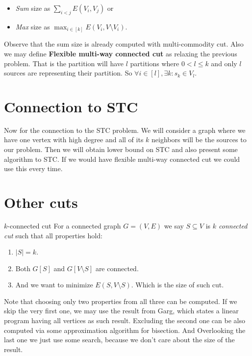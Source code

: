 \documentclass{article}
\begin{document}
	\begin{itemize}
		\item \textit{Sum} size as $\sum_{i < j} E(V_i, V_j)$ or
		\item \textit{Max} size as $\max_{i \in[k]} E(V_i, V \setminus V_i)$.
	\end{itemize}
	
	Observe that the sum size is already computed with multi-commodity cut. Also we may define \textbf{Flexible multi-way connected cut} as relaxing the previous problem. That is the partition will have $l$ partitions where $0 < l \leq k$ and only $l$ sources are representing their partition. So $\forall i \in [l] , \exists k : s_k \in V_l$.
	
	\section{Connection to STC}
	
	Now for the connection to the STC problem. We will consider a graph where we have one vertex with high degree and all of its $k$ neighbors will be the sources to our problem. Then we will obtain lower bound on STC and also present some algorithm to STC. If we would have flexible multi-way connected cut we could use this every time.
	
	\section{Other cuts}
	
	\begin{defn}{$k$-connected cut}
		For a connected graph $G = (V,E)$ we say $S \subseteq V$ is \textit{$k$ connected cut} such that all properties hold:
		
		\begin{enumerate}
			\item $|S| = k$.
			\item Both $G[S]$ and $G[V \setminus S]$ are connected.
			\item And we want to minimize $E(S, V \setminus S)$. Which is the size of such cut.
		\end{enumerate}
	\end{defn}
	
	
	Note that choosing only two properties from all three can be computed. If we skip the very first one, we may use the result from Garg, which states a linear program having all vertices as such result. Excluding the second one can be also computed via some approximation algorithm for bisection. And Overlooking the last one we just use some search, because we don't care about the size of the result.
\end{document}
